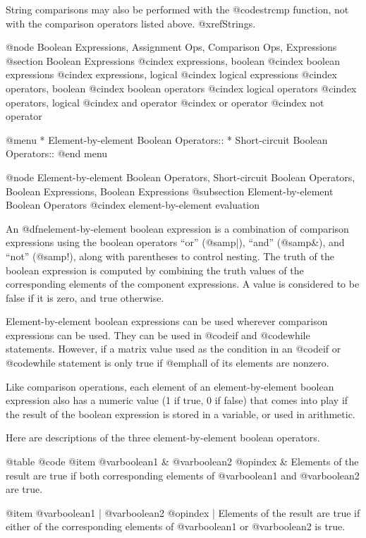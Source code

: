 String comparisons may also be performed with the @code{strcmp}
function, not with the comparison operators listed above.
@xref{Strings}.

@node Boolean Expressions, Assignment Ops, Comparison Ops, Expressions
@section Boolean Expressions
@cindex expressions, boolean
@cindex boolean expressions
@cindex expressions, logical
@cindex logical expressions
@cindex operators, boolean
@cindex boolean operators
@cindex logical operators
@cindex operators, logical
@cindex and operator
@cindex or operator
@cindex not operator

@menu
* Element-by-element Boolean Operators::  
* Short-circuit Boolean Operators::  
@end menu

@node Element-by-element Boolean Operators, Short-circuit Boolean Operators, Boolean Expressions, Boolean Expressions
@subsection Element-by-element Boolean Operators
@cindex element-by-element evaluation

An @dfn{element-by-element boolean expression} is a combination of
comparison expressions using the boolean
operators ``or'' (@samp{|}), ``and'' (@samp{&}), and ``not'' (@samp{!}),
along with parentheses to control nesting.  The truth of the boolean
expression is computed by combining the truth values of the
corresponding elements of the component expressions.  A value is
considered to be false if it is zero, and true otherwise.

Element-by-element boolean expressions can be used wherever comparison
expressions can be used.  They can be used in @code{if} and @code{while}
statements.  However, if a matrix value used as the condition in an
@code{if} or @code{while} statement is only true if @emph{all} of its
elements are nonzero.

Like comparison operations, each element of an element-by-element
boolean expression also has a numeric value (1 if true, 0 if false) that
comes into play if the result of the boolean expression is stored in a
variable, or used in arithmetic.

Here are descriptions of the three element-by-element boolean operators.

@table @code
@item @var{boolean1} & @var{boolean2}
@opindex &
Elements of the result are true if both corresponding elements of
@var{boolean1} and @var{boolean2} are true.

@item @var{boolean1} | @var{boolean2}
@opindex |
Elements of the result are true if either of the corresponding elements
of @var{boolean1} or @var{boolean2} is true.

